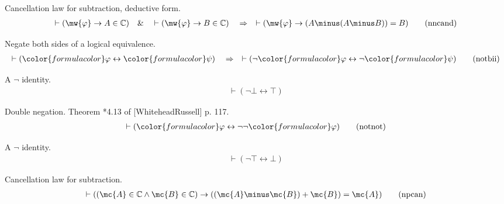 \begin{lemma} {Cancellation law for subtraction, deductive form.}
\begin{align}
\vdash ( \mw{\varphi} \rightarrow A \in \mathbb{C} )\quad\&\quad \vdash (
    \mw{\varphi} \rightarrow B \in \mathbb{C} )\quad\Rightarrow\quad \vdash (
    \mw{\varphi} \rightarrow ( A \minus ( A \minus B ) ) = B
    )\label{eq:nncand}\tag{nncand}
\end{align}
\end{lemma}


\begin{lemma} {Negate both sides of a logical equivalence.} 
\begin{align}
\vdash ( {\color{formulacolor}\varphi} \leftrightarrow
    {\color{formulacolor}\psi} )\quad\Rightarrow\quad \vdash ( \lnot
    {\color{formulacolor}\varphi} \leftrightarrow \lnot
    {\color{formulacolor}\psi} )\label{eq:notbii}\tag{notbii}
\end{align}
\end{lemma}


\begin{lemma} {A $\lnot$ identity.}  
\begin{align}
\vdash ( \lnot \bot \leftrightarrow \top )\label{eq:notfal}\tag{notfal}
\end{align}
\end{lemma}


\begin{lemma} {Double negation.}  Theorem *4.13 of
[WhiteheadRussell] p. 117.
\begin{align}
\vdash ( {\color{formulacolor}\varphi} \leftrightarrow \lnot \lnot
    {\color{formulacolor}\varphi} )\label{eq:notnot}\tag{notnot}
\end{align}
\end{lemma}


\begin{lemma} {A $\lnot$ identity.}  
\begin{align}
\vdash ( \lnot \top \leftrightarrow \bot )\label{eq:nottru}\tag{nottru}
\end{align}
\end{lemma}


\begin{lemma} {Cancellation law for subtraction.} 
\begin{align}
\vdash ( ( \mc{A} \in \mathbb{C} \wedge \mc{B} \in \mathbb{C} ) \rightarrow ( (
    \mc{A} \minus \mc{B} ) + \mc{B} ) = \mc{A} )\label{eq:npcan}\tag{npcan}
\end{align}
\end{lemma}


